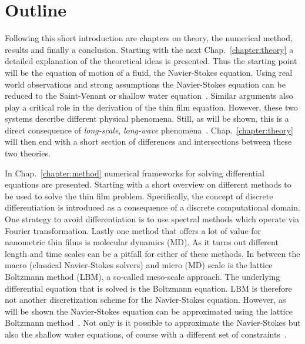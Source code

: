 \section{Outline}
\label{section:outline}
Following this short introduction are chapters on theory, the numerical method, results and finally a conclusion.
Starting with the next Chap.~\ref{chapter:theory} a detailed explanation of the theoretical ideas is presented.
Thus the starting point will be the equation of motion of a fluid, the Navier-Stokes equation.
Using real world observations and strong assumptions the Navier-Stokes equation can be reduced to the Saint-Venant or shallow water equation~\cite{bTheorieMouvementNonpermanent1871}.
Similar arguments also play a critical role in the derivation of the thin film equation.
However, these two systems describe different physical phenomena.
Still, as will be shown, this is a direct consequence of \textit{long-scale}, \textit{long-wave}  phenomena~\cite{oronLongscaleEvolutionThin1997}.
Chap.~\ref{chapter:theory} will then end with a short section of differences and intersections between these two theories.

In Chap.~\ref{chapter:method} numerical frameworks for solving differential equations are presented.
Starting with a short overview on different methods to be used to solve the thin film problem.
Specifically, the concept of discrete differentiation is introduced as a consequence of a discrete computational domain. 
One strategy to avoid differentiation is to use spectral methods which operate via Fourier transformation. 
Lastly one method that offers a lot of value for nanometric thin films is molecular dynamics (MD).
As it turns out different length and time scales can be a pitfall for either of these methods.
In between the macro (classical Navier-Stokes solvers) and micro (MD) scale is the lattice Boltzmann method (LBM), a so-called meso-scale approach.
The underlying differential equation that is solved is the Boltzmann equation. 
LBM is therefore not another discretization scheme for the Navier-Stokes equation. 
However, as will be shown the Navier-Stokes equation can be approximated using the lattice Boltzmann method~\cite{enskogKinetischeTheorieVorgange1917, chapmanMathematicalTheoryNonuniform1990, chenLatticeBoltzmannMethod1998, krugerLatticeBoltzmannMethod2017}.  
Not only is it possible to approximate the Navier-Stokes but also the shallow water equations, of course with a different set of constraints~\cite{salmonLatticeBoltzmannMethod1999, zhouLatticeBoltzmannMethods2004, vanthangStudy1DLattice2010, dellarNonhydrodynamicModesPriori2002}.

